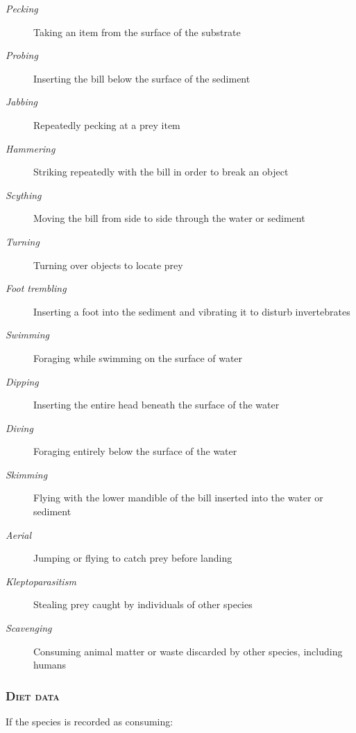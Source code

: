 \documentclass[12pt,a4paper]{book}
\begin{document}
\begin{description}
\item[\textit{Pecking}] Taking an item from the surface of the substrate
\item[\textit{Probing}] Inserting the bill below the surface of the sediment
\item[\textit{Jabbing}] Repeatedly pecking at a prey item
\item[\textit{Hammering}] Striking repeatedly with the bill in order to break an object
\item[\textit{Scything}] Moving the bill from side to side through the water or sediment
\item[\textit{Turning}] Turning over objects to locate prey
\item[\textit{Foot trembling}] Inserting a foot into the sediment and vibrating it to disturb invertebrates
\item[\textit{Swimming}] Foraging while swimming on the surface of water
\item[\textit{Dipping}] Inserting the entire head beneath the surface of the water
\item[\textit{Diving}] Foraging entirely below the surface of the water
\item[\textit{Skimming}] Flying with the lower mandible of the bill inserted into the water or sediment
\item[\textit{Aerial}] Jumping or flying to catch prey before landing
\item[\textit{Kleptoparasitism}] Stealing prey caught by individuals of other species
\item[\textit{Scavenging}] Consuming animal matter or waste discarded by other species, including humans
\end{description}
\medskip
\subsubsection{\textsc{Diet data}} If the species is recorded as consuming:
\end{document}
